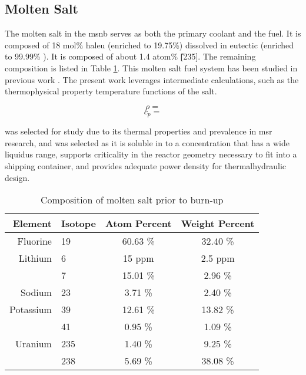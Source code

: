 \subsection{Molten Salt}
The molten salt in the \acs{msnb} serves as both the primary coolant and the fuel. It is composed of 18 mol\% \acs{haleu} \UF \; (enriched to 19.75\%) dissolved in eutectic \flinak (enriched to 99.99\% \Li[7]). It is composed of about 1.4 atom\% \U[235]. The remaining composition is listed in Table \ref{tab:saltcomp}. This molten salt fuel system has been studied in previous work \cite{CarterPHD}. The present work leverages intermediate calculations, such as the thermophysical property temperature functions of the salt.

\begin{equation}\label{eq:saltdens}
    \rho = 
\end{equation}
\begin{equation}\label{eq:saltcp}
    c_p = 
\end{equation}

\flinak was selected for study due to its thermal properties and prevalence in \acs{msr} research, and \UF \; was selected as it is soluble in \flinak to a concentration that has a wide liquidus range, supports criticality in the reactor geometry necessary to fit into a shipping container, and provides adequate power density for thermalhydraulic design. 

\begin{table}[ht!]
    \caption[Molten salt composition]{Composition of molten salt prior to burn-up}
    \centering
    \begin{tabular}{rl|cc}
     Element&Isotope&Atom Percent & Weight Percent \\ \hline
     Fluorine  & 19  & 60.63 \%  & 32.40 \% \\  \hline
     Lithium   & 6   & 15 ppm    & 2.5 ppm  \\
               & 7   & 15.01 \%  & 2.96 \%  \\ \hline
     Sodium    & 23  &  3.71 \%  & 2.40 \%  \\ \hline
     Potassium & 39  & 12.61 \%  & 13.82 \% \\
               & 41  & 0.95 \%  & 1.09 \%  \\ \hline
    Uranium    & 235 & 1.40 \%   & 9.25 \%  \\
               & 238 & 5.69 \%   & 38.08 \% \\
    \end{tabular}
    \label{tab:saltcomp}
\end{table}

